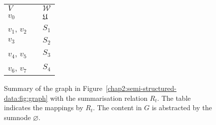 \begin{figure}
	\centering
	\begin{minipage}{.7\textwidth}
		\resizebox{\textwidth}{!}{
			
		}
	\end{minipage}
	\quad
	\begin{minipage}[h]{.25\textwidth}
		\centering
		\caption*{$R_t\left(V, \mathcal{W}\right)$}
		\begin{tabular}{lc@{\hs}l}
			\toprule
			$V$ & \phantom{a} & $\mathcal{W}$ \\
			\cmidrule{1-1} \cmidrule{3-3}
			$v_0$ & \phantom{a} & $\mathfrak{U}$ \\
			$v_1$, $v_2$ & \phantom{a} & $S_1$ \\
			$v_3$ & \phantom{a} & $S_2$ \\
			$v_4$, $v_5$ & \phantom{a} & $S_3$ \\
			$v_6$, $v_7$ & \phantom{a} & $S_4$ \\
			\bottomrule
		\end{tabular}
	\end{minipage}
	\caption[\gls{typessummary} of a graph]{Summary of the graph in Figure~\ref{chap2:semi-structured-data:fig:graph} with the summarisation relation $R_t$. The table indicates the mappings by $R_t$. The content in $G$ is abstracted by the sumnode $\varnothing$.}
	\label{chap4:summary:fig:classes-summary}
\end{figure}

%

